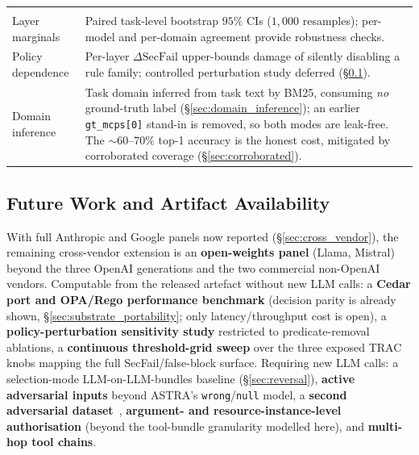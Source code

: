 \documentclass[sigconf,review,anonymous]{acmart}
\begin{document}
\begin{table}[!t]
\begin{tabularx}{\columnwidth}{@{}>{\raggedright\arraybackslash}p{1.8cm}>{\raggedright\arraybackslash}X@{}}
\midrule
\multicolumn{2}{@{}l}{\textit{Statistical}} \\
Layer marginals & Paired task-level bootstrap $95\%$ CIs ($1{,}000$ resamples); per-model and per-domain agreement provide robustness checks. \\
Policy dependence & Per-layer $\Delta\mathrm{SecFail}$ upper-bounds damage of silently disabling a rule family; controlled perturbation study deferred (\S\ref{sec:future_work}). \\
Domain inference & Task domain inferred from task text by BM25, consuming \emph{no} ground-truth label (\S\ref{sec:domain_inference}); an earlier \texttt{gt\_mcps[0]} stand-in is removed, so both modes are leak-free. The $\sim\!60$--$70\%$ top-1 accuracy is the honest cost, mitigated by corroborated coverage (\S\ref{sec:corroborated}). \\
\bottomrule
\end{tabularx}
\end{table}

\subsection{Future Work and Artifact Availability}
\label{sec:future_work}
\label{sec:artifacts}

With full Anthropic and Google panels now reported (\S\ref{sec:cross_vendor}), the remaining cross-vendor extension is an \textbf{open-weights panel} (Llama, Mistral) beyond the three OpenAI generations and the two commercial non-OpenAI vendors. Computable from the released artefact without new LLM calls: a \textbf{Cedar port and OPA/Rego performance benchmark} (decision parity is already shown, \S\ref{sec:substrate_portability}; only latency/throughput cost is open), a \textbf{policy-perturbation sensitivity study} restricted to predicate-removal ablations, a \textbf{continuous threshold-grid sweep} over the three exposed TRAC knobs mapping the full SecFail/false-block surface. Requiring new LLM calls: a selection-mode LLM-on-LLM-bundles baseline (\S\ref{sec:reversal}), \textbf{active adversarial inputs} beyond ASTRA's \texttt{wrong}/\texttt{null} model, a \textbf{second adversarial dataset}~\cite{zhan2024injecagent,debenedetti2024agentdojo,ruan2024toolemu}, \textbf{argument- and resource-instance-level authorisation} (beyond the tool-bundle granularity modelled here), and \textbf{multi-hop tool chains}.
\end{document}
